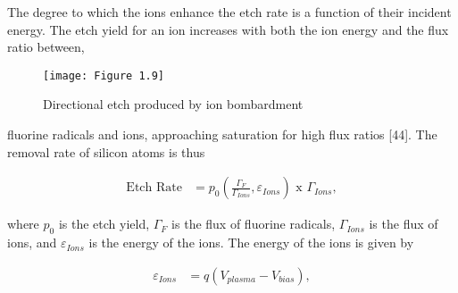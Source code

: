 The degree to which the ions enhance the etch rate is a function of their incident energy. The etch yield for an ion increases with both the ion energy and the flux ratio between,

\begin{figure}[H]
	\centering
	\texttt{[image: Figure 1.9]}
	\bf\caption{Directional etch produced by ion bombardment}
	\label{fig:1.9}
\end{figure}

\noindent fluorine radicals and ions, approaching saturation for high flux ratios [44]. The removal rate of silicon atoms is thus


\begin{align}
	\text{Etch Rate} &= p_{0} \left( \frac{\Gamma_{F}}{\Gamma_{Ions}}, \varepsilon_{Ions} \right) \text{ x } \Gamma_{Ions},
\end{align}

\noindent where $p_{0}$ is the etch yield, $\Gamma_{F}$ is the flux of fluorine radicals, $\Gamma_{Ions}$ is the flux of ions, and $\varepsilon_{Ions}$ is the energy of the ions. The energy of the ions is given by

\begin{align}
	\varepsilon_{Ions} &= q \left( V_{plasma}-V_{bias}\right),
\end{align}

